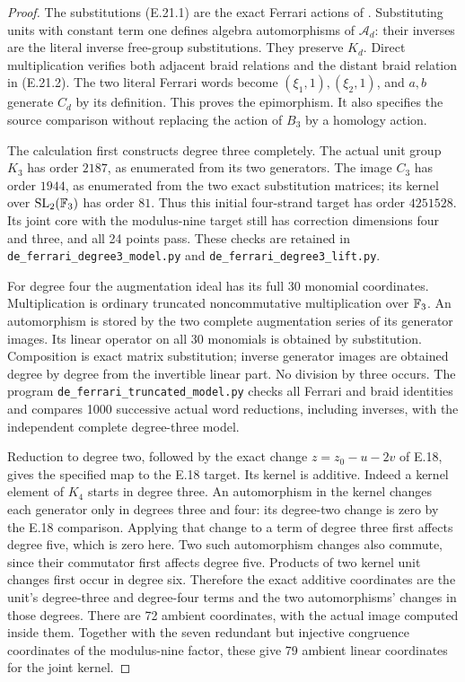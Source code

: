 \begin{proof}
The substitutions (E.21.1) are the exact
Ferrari actions of
\cite[(2.9) and (4.15)]{DE_NakamuraTsunogaiYasuda2010}.
Substituting units with constant term one
defines algebra automorphisms of
$\mathcal A_d$: their inverses are the
literal inverse free-group substitutions.
They preserve $K_d$. Direct multiplication
verifies both adjacent braid relations and
the distant braid relation in (E.21.2).
The two literal Ferrari words become
$(\xi_1,1),(\xi_2,1)$, and $a,b$ generate
$C_d$ by its definition. This proves the
epimorphism. It also specifies the source
comparison without replacing the action
of $B_3$ by a homology action.

The calculation first constructs degree
three completely. The actual unit group
$K_3$ has order $2187$, as enumerated
from its two generators. The image
$C_3$ has order $1944$, as enumerated
from the two exact substitution matrices;
its kernel over $\mathrm{SL}_2(\mathbb F_3)$
has order $81$. Thus this initial
four-strand target has order $4251528$.
Its joint core with the modulus-nine
target still has correction dimensions
four and three, and all 24 points pass.
These checks are retained in
\texttt{de\_ferrari\_degree3\_model.py}
and \texttt{de\_ferrari\_degree3\_lift.py}.

For degree four the augmentation ideal
has its full 30 monomial coordinates.
Multiplication is ordinary truncated
noncommutative multiplication over
$\mathbb F_3$. An automorphism is stored by
the two complete augmentation series
of its generator images. Its linear
operator on all 30 monomials is obtained
by substitution. Composition is exact
matrix substitution; inverse generator
images are obtained degree by degree
from the invertible linear part.
No division by three occurs. The
program \texttt{de\_ferrari\_truncated\_model.py}
checks all Ferrari and braid identities
and compares 1000 successive actual
word reductions, including inverses,
with the independent complete
degree-three model.

Reduction to degree two, followed by
the exact change $z=z_0-u-2v$ of E.18,
gives the specified map to the E.18
target. Its kernel is additive. Indeed
a kernel element of $K_4$ starts in
degree three. An automorphism in the
kernel changes each generator only
in degrees three and four: its
degree-two change is zero by the
E.18 comparison. Applying that change
to a term of degree three first affects
degree five, which is zero here.
Two such automorphism changes also
commute, since their commutator first
affects degree five. Products of two
kernel unit changes first occur in
degree six. Therefore the exact
additive coordinates are the unit's
degree-three and degree-four terms
and the two automorphisms' changes
in those degrees. There are 72
ambient coordinates, with the
actual image computed inside them.
Together with the seven redundant
but injective congruence coordinates
of the modulus-nine factor, these
give 79 ambient linear coordinates
for the joint kernel.


\end{proof}
